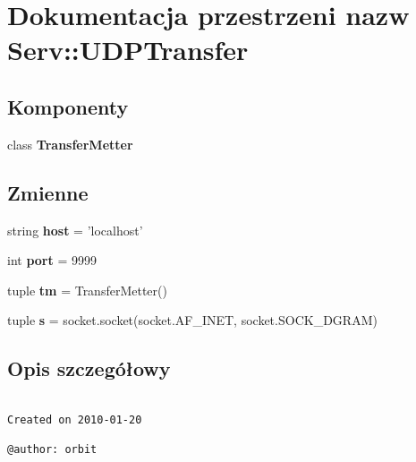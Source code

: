 \hypertarget{namespace_serv_1_1_u_d_p_transfer}{
\section{Dokumentacja przestrzeni nazw Serv::UDPTransfer}
\label{namespace_serv_1_1_u_d_p_transfer}
}
\subsection*{Komponenty}
\begin{CompactItemize}
\item 
class \textbf{TransferMetter}
\end{CompactItemize}
\subsection*{Zmienne}
\begin{CompactItemize}
\item 
\hypertarget{namespace_serv_1_1_u_d_p_transfer_55a5e22f5afa347b0930593143603e5f}{
string \textbf{host} = 'localhost'}
\label{namespace_serv_1_1_u_d_p_transfer_55a5e22f5afa347b0930593143603e5f}

\item 
\hypertarget{namespace_serv_1_1_u_d_p_transfer_6b3264849b0bc1fe8c6ece423db08830}{
int \textbf{port} = 9999}
\label{namespace_serv_1_1_u_d_p_transfer_6b3264849b0bc1fe8c6ece423db08830}

\item 
\hypertarget{namespace_serv_1_1_u_d_p_transfer_777000464bd3c767a938e44f275ba041}{
tuple \textbf{tm} = TransferMetter()}
\label{namespace_serv_1_1_u_d_p_transfer_777000464bd3c767a938e44f275ba041}

\item 
\hypertarget{namespace_serv_1_1_u_d_p_transfer_cd174dad7f5a1d16b6cd52802689ab26}{
tuple \textbf{s} = socket.socket(socket.AF\_\-INET, socket.SOCK\_\-DGRAM)}
\label{namespace_serv_1_1_u_d_p_transfer_cd174dad7f5a1d16b6cd52802689ab26}

\end{CompactItemize}


\subsection{Opis szczegółowy}


\footnotesize\begin{verbatim}

Created on 2010-01-20

@author: orbit
\end{verbatim}
\normalsize
 

